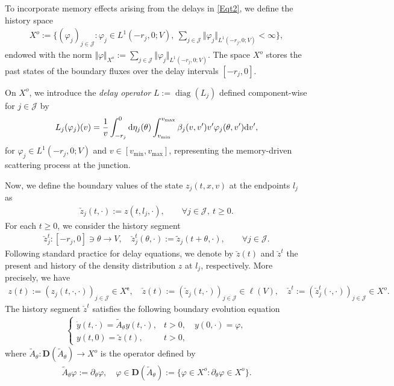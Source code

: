 \documentclass[onecolumn]{autart}
\numberwithin{equation}{section}
\begin{document}
	To incorporate memory effects arising from the delays in \eqref{Eqt2}, we define the history space
	\begin{align*}
		X^{o}:= \big\{ (\varphi_j)_{j\in \mathcal{J}} : \varphi_j \in L^1(-r_j,0;V),\ \sum_{j\in \mathcal{J}} \Vert \varphi_j\Vert_{L^1(-r_j,0;V)} < \infty \big\},
	\end{align*}
	endowed with the norm $\Vert \varphi\Vert_{X^o}:=\sum_{j\in \mathcal{J}} \Vert \varphi_j\Vert_{L^1(-r_j,0;V)}$. The space $X^{o}$ stores the past states of the boundary fluxes over the delay intervals $[-r_j,0]$.
	
	On $X^{o}$, we introduce the \emph{delay operator} ${L}:= \operatorname{diag}({L}_j)$ defined component-wise for $j\in \mathcal{J}$ by
	\begin{equation}\label{delay-operator}
		{L}_{j}(\varphi_j)(v)=\frac{1}{v}\int_{-r_j}^{0}{\rm d}\eta_j(\theta)\int_{v_{\min}}^{v_{\max}} \beta_j(v,v')v'\varphi_j(\theta,v'){\rm d}v',
	\end{equation}
	for  $\varphi_j\in L^1(-r_j,0;V)$ and $v\in [v_{\min}, v_{\max}]$,
	representing the memory-driven scattering process at the junction.
	
    Now, we define the boundary values of the state $z_j(t,x,v)$ at the endpoints $l_j$ as
	\begin{align*}
		\check{z}_j(t,\cdot):=z(t,l_j,\cdot), \qquad \forall j\in \mathcal{J},\ t\ge 0.
	\end{align*}
	For each $t\ge 0$, we consider the history segment
	\begin{align*}
		\check{z}^t_j:[-r_{j},0] \ni \theta\to V,\quad \check{z}^t_j(\theta,\cdot):=\tilde{z}_j(t+\theta,\cdot), \qquad \forall j\in \mathcal{J}.
	\end{align*}
	Following standard practice for delay equations, we denote by $\check{z}(t)$ and $\check{z}^t$ the present and history of the density distribution $z$ at $l_j$, respectively. More precisely, we have
	\begin{align*}
		z(t):=(z_j(t,\cdot,\cdot))_{j\in \mathcal{J}}\in X^{\mathsf{e}},\quad
		\check{z}(t):=(\check{z}_j(t,\cdot))_{j\in \mathcal{J}}\in {\bm \ell}(V), \quad
		\check{z}^t:=(\check{z}^t_j(\cdot,\cdot))_{j\in \mathcal{J}}\in X^{o}.
	\end{align*}
	The history segment $\check{z}^t$ satisfies the following boundary evolution equation
	\begin{align}\label{shift}
		\begin{cases}
			\dot{y}(t,\cdot)= \tilde{A}_{\theta} y(t,\cdot),& t> 0,\quad y(0,\cdot)=\varphi,\\
			y(t,0)= \tilde{z}(t), &t> 0,
		\end{cases}
	\end{align}
	where $\tilde{A}_\theta:{\bm D}(\tilde{A}_\theta)\to X^{o}$ is the operator defined by
	\begin{align*}%
		\tilde{A}_\theta \varphi:=  \partial_\theta\varphi, \quad
		\varphi\in  {\bm D}(\tilde{A}_{\theta}):= \big\{ \varphi \in X^{o}: \partial_\theta \varphi\in X^{o}\big\}.
	\end{align*}
	
\end{document}
